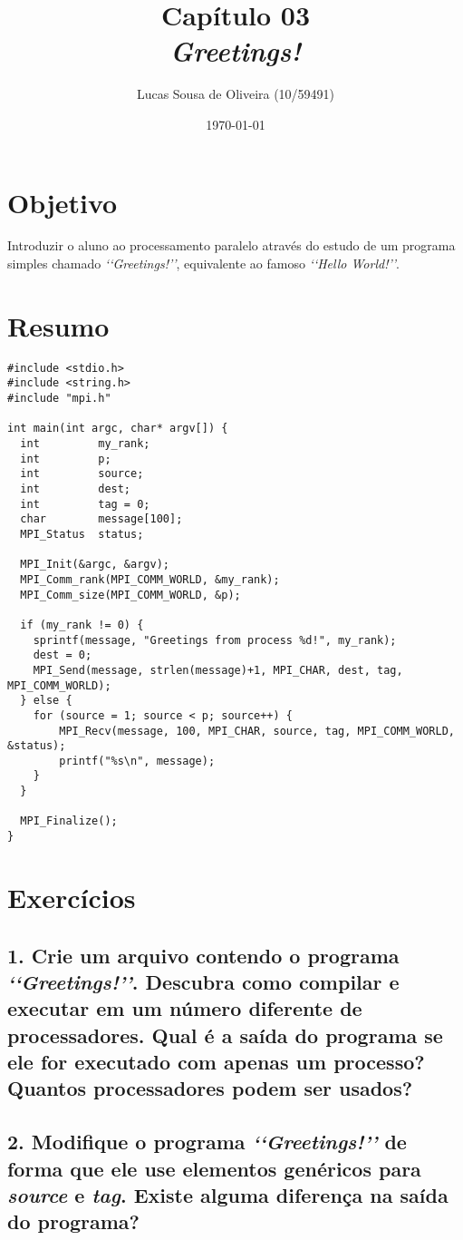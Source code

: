 \documentclass[11pt,a4paper]{article}
\title{{\large Capítulo 03}\\\textit{Greetings!}}
\author{Lucas Sousa de Oliveira (10/59491)}
\date{\today}
\begin{document}
\maketitle

\section*{Objetivo}
Introduzir o aluno ao processamento paralelo através do estudo de um programa simples chamado \textit{\lq\lq{}Greetings!\rq\rq{}}, equivalente ao famoso \textit{\lq\lq{}Hello World!\rq\rq{}}.

\section*{Resumo}

\begin{lstlisting}[style=customc]
#include <stdio.h>
#include <string.h>
#include "mpi.h"

int main(int argc, char* argv[]) {
  int         my_rank;
  int         p;
  int         source;
  int         dest;
  int         tag = 0;
  char        message[100];
  MPI_Status  status;

  MPI_Init(&argc, &argv);
  MPI_Comm_rank(MPI_COMM_WORLD, &my_rank);
  MPI_Comm_size(MPI_COMM_WORLD, &p);

  if (my_rank != 0) {
    sprintf(message, "Greetings from process %d!", my_rank);
    dest = 0;
    MPI_Send(message, strlen(message)+1, MPI_CHAR, dest, tag, MPI_COMM_WORLD);
  } else {
    for (source = 1; source < p; source++) {
        MPI_Recv(message, 100, MPI_CHAR, source, tag, MPI_COMM_WORLD, &status);
        printf("%s\n", message);
    }
  }

  MPI_Finalize();
}
\end{lstlisting}

\section*{Exercícios}
\subsection*{1. Crie um arquivo contendo o programa \textit{\lq\lq{}Greetings!\rq\rq{}}. Descubra como compilar e executar em um número diferente de processadores. Qual é a saída do programa se ele for executado com apenas um processo? Quantos processadores podem ser usados?}
\subsection*{2. Modifique o programa \textit{\lq\lq{}Greetings!\rq\rq{}} de forma que ele use elementos genéricos para \textit{source} e \textit{tag}. Existe alguma diferença na saída do programa?}
\end{document}
